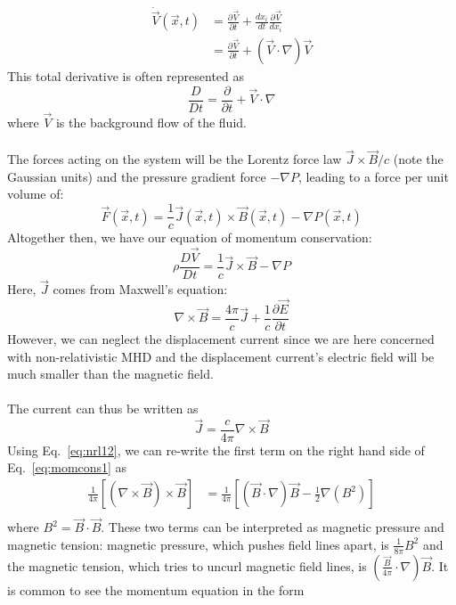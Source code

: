   \begin{align}
    \dot{ \vec V}(\vec x,t)&=\frac{\partial \vec V}{\partial t}+\frac{dx_i}{dt}\frac{\partial \vec V}{dx_i}\\
    &=\frac{\partial\vec V}{\partial t}+\left(\vec V\cdot\nabla\right)\vec V
  \end{align}
  This total derivative is often represented as
  \begin{equation}
    \frac{D}{Dt}=\frac\partial{\partial t}+\vec V\cdot\nabla
  \end{equation}
  where $\vec V$ is the background flow of the fluid.\\
\\
  The forces acting on the system will be the Lorentz force law $\vec J\times\vec B/c$ (note the Gaussian units) and the pressure gradient force $-\nabla P$, leading to a force per unit volume of:
\begin{equation}
  \vec F(\vec x,t)=\frac1c\vec J(\vec x,t)\times \vec B(\vec x,t)-\nabla P(\vec x,t)
\end{equation}
Altogether then, we have our equation of momentum conservation:
\begin{equation}
  \rho\frac{D\vec V}{Dt}=\frac1c\vec J\times\vec B-\nabla P \label{eq:momcons1}
\end{equation}
Here, $\vec J$ comes from Maxwell's equation:
\begin{equation}
  \nabla\times\vec B=\frac{4\pi}c\vec J+\frac1c\frac{\partial\vec E}{\partial t}
\end{equation}
However, we can neglect the displacement current since we are here concerned with non-relativistic MHD and the displacement current's electric field will be much smaller than the magnetic field.\\
\\
The current can thus be written as
\begin{equation}
  \vec J=\frac{c}{4\pi}\nabla\times\vec B \label{eq:current}
\end{equation}
Using Eq.~\ref{eq:nrl12}, we can re-write the first term on the right hand side of Eq.~\ref{eq:momcons1} as
\begin{align}
  \frac1{4\pi}\left[(\nabla\times\vec B)\times\vec B\right]&=\frac1{4\pi}\left[(\vec B\cdot\nabla)\vec B-\frac12\nabla(B^2)\right]\\
\end{align}
where $B^2=\vec B\cdot\vec B$. These two terms can be interpreted as magnetic pressure and magnetic tension: magnetic pressure, which pushes field lines apart, is $\frac1{8\pi} B^2$ and the magnetic tension, which tries to uncurl magnetic field lines, is $(\frac{\vec B}{4\pi}\cdot\nabla)\vec B$. It is common to see the momentum equation in the form
